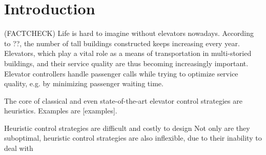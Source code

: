 \section{Introduction}

(FACTCHECK)
Life is hard to imagine without elevators nowadays. According to ??, the number of tall buildings constructed keeps increasing every year. Elevators, which play a vital role as a means of transportation in multi-storied buildings, and their service quality are thus becoming increasingly important. Elevator controllers handle passenger calls while trying to optimize service quality, e.g. by minimizing passenger waiting time.

The core of classical and even state-of-the-art elevator control strategies are heuristics. Examples are [examples]. 

Heuristic control strategies are difficult and costly to design 
Not only are they suboptimal, heuristic control strategies are also inflexible, due to their inability to deal with 

